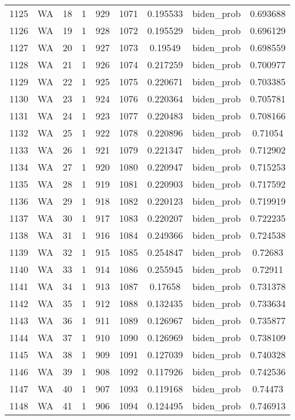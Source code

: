\documentclass[12pt,a4paper]{article}
\begin{document}
\begin{tabular}{r|cccccccc}
	1125 & WA & 18 & 1 & 929 & 1071 & 0.195533 & biden\_prob & 0.693688 \\
	1126 & WA & 19 & 1 & 928 & 1072 & 0.195529 & biden\_prob & 0.696129 \\
	1127 & WA & 20 & 1 & 927 & 1073 & 0.19549 & biden\_prob & 0.698559 \\
	1128 & WA & 21 & 1 & 926 & 1074 & 0.217259 & biden\_prob & 0.700977 \\
	1129 & WA & 22 & 1 & 925 & 1075 & 0.220671 & biden\_prob & 0.703385 \\
	1130 & WA & 23 & 1 & 924 & 1076 & 0.220364 & biden\_prob & 0.705781 \\
	1131 & WA & 24 & 1 & 923 & 1077 & 0.220483 & biden\_prob & 0.708166 \\
	1132 & WA & 25 & 1 & 922 & 1078 & 0.220896 & biden\_prob & 0.71054 \\
	1133 & WA & 26 & 1 & 921 & 1079 & 0.221347 & biden\_prob & 0.712902 \\
	1134 & WA & 27 & 1 & 920 & 1080 & 0.220947 & biden\_prob & 0.715253 \\
	1135 & WA & 28 & 1 & 919 & 1081 & 0.220903 & biden\_prob & 0.717592 \\
	1136 & WA & 29 & 1 & 918 & 1082 & 0.220123 & biden\_prob & 0.719919 \\
	1137 & WA & 30 & 1 & 917 & 1083 & 0.220207 & biden\_prob & 0.722235 \\
	1138 & WA & 31 & 1 & 916 & 1084 & 0.249366 & biden\_prob & 0.724538 \\
	1139 & WA & 32 & 1 & 915 & 1085 & 0.254847 & biden\_prob & 0.72683 \\
	1140 & WA & 33 & 1 & 914 & 1086 & 0.255945 & biden\_prob & 0.72911 \\
	1141 & WA & 34 & 1 & 913 & 1087 & 0.17658 & biden\_prob & 0.731378 \\
	1142 & WA & 35 & 1 & 912 & 1088 & 0.132435 & biden\_prob & 0.733634 \\
	1143 & WA & 36 & 1 & 911 & 1089 & 0.126967 & biden\_prob & 0.735877 \\
	1144 & WA & 37 & 1 & 910 & 1090 & 0.126969 & biden\_prob & 0.738109 \\
	1145 & WA & 38 & 1 & 909 & 1091 & 0.127039 & biden\_prob & 0.740328 \\
	1146 & WA & 39 & 1 & 908 & 1092 & 0.117926 & biden\_prob & 0.742536 \\
	1147 & WA & 40 & 1 & 907 & 1093 & 0.119168 & biden\_prob & 0.74473 \\
	1148 & WA & 41 & 1 & 906 & 1094 & 0.124495 & biden\_prob & 0.746913 \\

\end{tabular}
\end{document}
